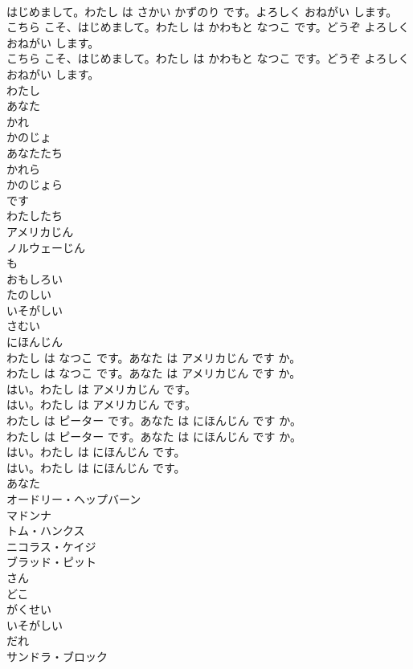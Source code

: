 \documentclass[8pt]{extreport}
\begin{document}
\begin{CJK}{UTF8}{min}
\\	はじめまして。わたし は さかい かずのり です。よろしく おねがい します。 
\\	こちら こそ、はじめまして。わたし は かわもと なつこ です。どうぞ よろしく おねがい します。	
\\	こちら こそ、はじめまして。わたし は かわもと なつこ です。どうぞ よろしく おねがい します。 
\\	わたし
\\	あなた
\\	かれ
\\	かのじょ
\\	あなたたち
\\	かれら
\\	かのじょら
\\	です
\\	わたしたち
\\	アメリカじん
\\	ノルウェーじん
\\	も
\\	おもしろい
\\	たのしい
\\	いそがしい
\\	さむい
\\	にほんじん
\\	わたし は なつこ です。あなた は アメリカじん です か。	
\\	わたし は なつこ です。あなた は アメリカじん です か。 
\\	はい。わたし は アメリカじん です。	
\\	はい。わたし は アメリカじん です。 
\\	わたし は ピーター です。あなた は にほんじん です か。	
\\	わたし は ピーター です。あなた は にほんじん です か。 
\\	はい。わたし は にほんじん です。	
\\	はい。わたし は にほんじん です。 
\\	あなた
\\	オードリー・ヘップバーン
\\	マドンナ
\\	トム・ハンクス
\\	ニコラス・ケイジ
\\	ブラッド・ピット
\\	さん
\\	どこ
\\	がくせい
\\	いそがしい
\\	だれ
\\	サンドラ・ブロック

\end{CJK}
\end{document}
